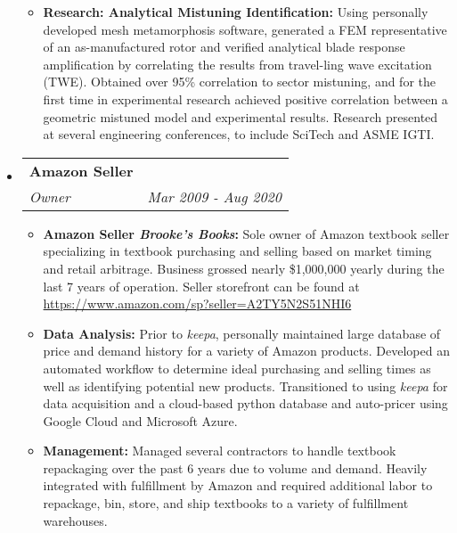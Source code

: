 \documentclass[letterpaper,11pt]{article}
\makeatletter
\newcommand{\resitem}[1]{\item #1 \vspace{-2pt}}
\newcommand{\ressubheading}[4]{
\begin{tabular*}{7.0in}{l@{\extracolsep{\fill}}r}
		\textbf{#1} & #2 \\
		\textit{#3} & \textit{#4} \\
\end{tabular*}\vspace{-6pt}}
\makeatother
\begin{document}
\begin{itemize}
\begin{itemize}
    \resitem{\textbf{Research: Analytical Mistuning Identification:} Using personally developed mesh metamorphosis software, generated a FEM representative of an as-manufactured rotor and verified analytical blade response amplification by correlating the results from travel-ling wave excitation (TWE).  Obtained over 95\% correlation to sector mistuning, and for the first time in experimental research achieved positive correlation between a geometric mistuned model and experimental results.  Research presented at several engineering conferences, to include SciTech and ASME IGTI.}
  \end{itemize}

\item
  \ressubheading{Amazon Seller}{}{Owner}{Mar 2009 - Aug 2020}
  \begin{itemize}
    \resitem{\textbf{Amazon Seller \textit{Brooke's Books}:} Sole owner of Amazon textbook seller specializing in textbook purchasing and selling based on market timing and retail arbitrage.  Business grossed nearly \$1,000,000 yearly during the last 7 years of operation.  Seller storefront can be found at \url{https://www.amazon.com/sp?seller=A2TY5N2S51NHI6}}
    \resitem{\textbf{Data Analysis:} Prior to \textit{keepa}, personally maintained large database of price and demand history for a variety of Amazon products.  Developed an automated workflow to determine ideal purchasing and selling times as well as identifying potential new products.  Transitioned to using \textit{keepa} for data acquisition and a cloud-based python database and auto-pricer using Google Cloud and Microsoft Azure.}
    \resitem{\textbf{Management:} Managed several contractors to handle textbook repackaging over the past 6 years due to volume and demand.  Heavily integrated with fulfillment by Amazon and required additional labor to repackage, bin, store, and ship textbooks to a variety of fulfillment warehouses.}
  \end{itemize}


\end{itemize}
\end{document}

